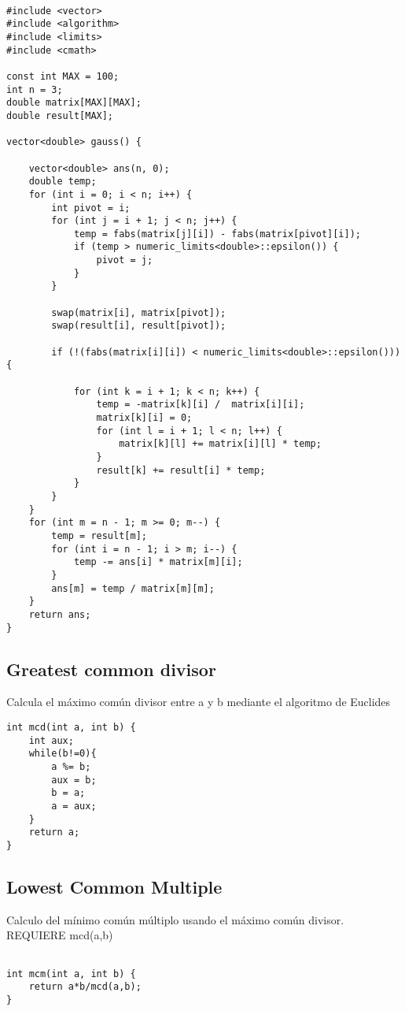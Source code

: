 \documentclass[11pt,letterpaper,twocolumn,twosided]{article}
\begin{document}
\begin{lstlisting}

#include <vector>
#include <algorithm>
#include <limits>
#include <cmath>

const int MAX = 100;
int n = 3;
double matrix[MAX][MAX];
double result[MAX];

vector<double> gauss() {
	
  	vector<double> ans(n, 0);
  	double temp;
	for (int i = 0; i < n; i++) {
    	int pivot = i;
	    for (int j = i + 1; j < n; j++) {
	    	temp = fabs(matrix[j][i]) - fabs(matrix[pivot][i]);
	      	if (temp > numeric_limits<double>::epsilon()) {
	        	pivot = j;
	      	}
	    }
	    
	    swap(matrix[i], matrix[pivot]);
	    swap(result[i], result[pivot]);
	    
	    if (!(fabs(matrix[i][i]) < numeric_limits<double>::epsilon())) {
	    	
	    	for (int k = i + 1; k < n; k++) {
		      	temp = -matrix[k][i] /  matrix[i][i];
		      	matrix[k][i] = 0;
		      	for (int l = i + 1; l < n; l++) {
		        	matrix[k][l] += matrix[i][l] * temp;
		      	}
		      	result[k] += result[i] * temp;
		    }
	    }
  	}
  	for (int m = n - 1; m >= 0; m--) {
    	temp = result[m];
    	for (int i = n - 1; i > m; i--) {
    		temp -= ans[i] * matrix[m][i];
    	}
    	ans[m] = temp / matrix[m][m];
  	}
  	return ans;
}
\end{lstlisting}

\subsection{Greatest common divisor}
Calcula el m\'aximo com\'un divisor entre a y b mediante el algoritmo de Euclides

\begin{lstlisting}
int mcd(int a, int b) {
	int aux;
	while(b!=0){
		a %= b;
		aux = b;
		b = a;
		a = aux;
	}
	return a;
}
\end{lstlisting}

\subsection{Lowest Common Multiple}
Calculo del m\'inimo com\'un m\'ultiplo usando el m\'aximo com\'un divisor. REQUIERE mcd(a,b)

\begin{lstlisting}

int mcm(int a, int b) {
	return a*b/mcd(a,b);
}
\end{lstlisting}
\end{document}
